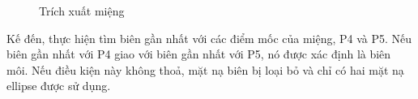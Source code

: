 \documentclass[journal]{IEEEtran}
\begin{document}
\begin{figure}[!h]
\caption{Trích xuất miệng}
\label{refhinh7}
\end{figure}

Kế đến, thực hiện tìm biên gần nhất với các điểm mốc của miệng, P4 và P5. Nếu biên gần nhất với P4 giao với biên gần nhất với P5, nó được xác định là biên môi. Nếu điều kiện này không thoả, mặt nạ biên bị loại bỏ và chỉ có hai mặt nạ ellipse được sử dụng.
\end{document}

